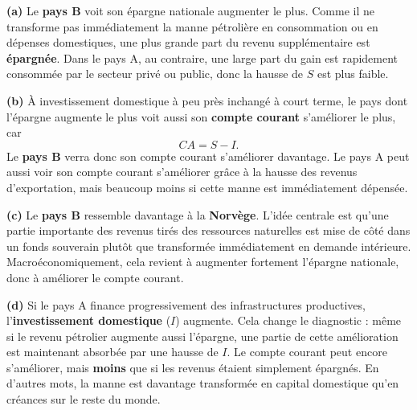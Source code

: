 \begin{reponse}
\textbf{(a)} Le \textbf{pays B} voit son épargne nationale augmenter le plus. Comme il ne transforme pas immédiatement la manne pétrolière en consommation ou en dépenses domestiques, une plus grande part du revenu supplémentaire est \textbf{épargnée}. Dans le pays A, au contraire, une large part du gain est rapidement consommée par le secteur privé ou public, donc la hausse de $S$ est plus faible.

\textbf{(b)} À investissement domestique à peu près inchangé à court terme, le pays dont l'épargne augmente le plus voit aussi son \textbf{compte courant} s'améliorer le plus, car
\begin{equation*} CA = S - I. \end{equation*}
Le \textbf{pays B} verra donc son compte courant s'améliorer davantage. Le pays A peut aussi voir son compte courant s'améliorer grâce à la hausse des revenus d'exportation, mais beaucoup moins si cette manne est immédiatement dépensée.

\textbf{(c)} Le \textbf{pays B} ressemble davantage à la \textbf{Norvège}. L'idée centrale est qu'une partie importante des revenus tirés des ressources naturelles est mise de côté dans un fonds souverain plutôt que transformée immédiatement en demande intérieure. Macroéconomiquement, cela revient à augmenter fortement l'épargne nationale, donc à améliorer le compte courant.

\textbf{(d)} Si le pays A finance progressivement des infrastructures productives, l'\textbf{investissement domestique} ($I$) augmente. Cela change le diagnostic : même si le revenu pétrolier augmente aussi l'épargne, une partie de cette amélioration est maintenant absorbée par une hausse de $I$. Le compte courant peut encore s'améliorer, mais \textbf{moins} que si les revenus étaient simplement épargnés. En d'autres mots, la manne est davantage transformée en capital domestique qu'en créances sur le reste du monde.
\end{reponse}


